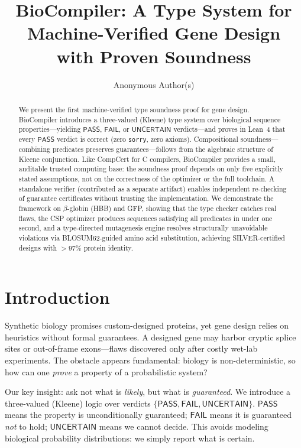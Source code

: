 \documentclass[runningheads]{llncs}
\title{BioCompiler: A Type System for Machine-Verified Gene Design\\with Proven Soundness}
\author{Anonymous Author(s)}
\institute{Anonymous Institution}
\newcommand{\PASS}{\ensuremath{\mathsf{PASS}}\xspace}
\newcommand{\FAIL}{\ensuremath{\mathsf{FAIL}}\xspace}
\newcommand{\UNCERTAIN}{\ensuremath{\mathsf{UNCERTAIN}}\xspace}
\begin{document}
\maketitle

\begin{abstract}
We present the first machine-verified type soundness proof for gene design.
BioCompiler introduces a three-valued (Kleene) type system over biological sequence properties---yielding \PASS, \FAIL, or \UNCERTAIN{} verdicts---and proves in Lean~4 that every \PASS{} verdict is correct (zero \texttt{sorry}, zero axioms).
Compositional soundness---combining predicates preserves guarantees---follows from the algebraic structure of Kleene conjunction.
Like CompCert for C compilers, BioCompiler provides a small, auditable trusted computing base: the soundness proof depends on only five explicitly stated assumptions, not on the correctness of the optimizer or the full toolchain.
A standalone verifier (contributed as a separate artifact) enables independent re-checking of guarantee certificates without trusting the implementation.
We demonstrate the framework on $\beta$-globin (HBB) and GFP, showing that the type checker catches real flaws, the CSP optimizer produces sequences satisfying all predicates in under one second, and a type-directed mutagenesis engine resolves structurally unavoidable violations via BLOSUM62-guided amino acid substitution, achieving SILVER-certified designs with $>$97\% protein identity.
\end{abstract}

\section{Introduction}\label{sec:intro}

Synthetic biology promises custom-designed proteins, yet gene design relies on heuristics without formal guarantees.
A designed gene may harbor cryptic splice sites or out-of-frame exons---flaws discovered only after costly wet-lab experiments.
The obstacle appears fundamental: biology is non-deterministic, so how can one \emph{prove} a property of a probabilistic system?

Our key insight: ask not what is \emph{likely}, but what is \emph{guaranteed}.
We introduce a three-valued (Kleene) logic over verdicts $\{\PASS, \FAIL, \UNCERTAIN\}$.
\PASS{} means the property is unconditionally guaranteed; \FAIL{} means it is guaranteed \emph{not} to hold; \UNCERTAIN{} means we cannot decide.
This avoids modeling biological probability distributions: we simply report what is certain.
\end{document}

